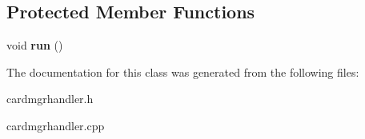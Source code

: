 \subsection*{Protected Member Functions}
\begin{DoxyCompactItemize}
\item 
\hypertarget{class_card_mgr_handler_a8564f11601568f30127d65c378c9d950}{void {\bfseries run} ()}\label{class_card_mgr_handler_a8564f11601568f30127d65c378c9d950}

\end{DoxyCompactItemize}


The documentation for this class was generated from the following files\-:\begin{DoxyCompactItemize}
\item 
cardmgrhandler.\-h\item 
cardmgrhandler.\-cpp\end{DoxyCompactItemize}
